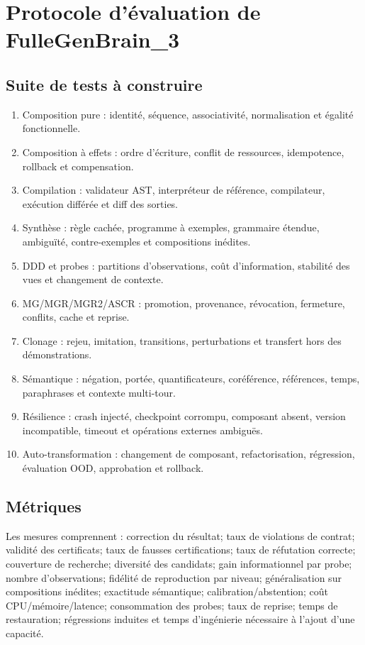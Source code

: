 \documentclass[11pt,a4paper]{article}
\begin{document}
\section{Protocole d'évaluation de FulleGenBrain\_3}
\subsection{Suite de tests à construire}
\begin{enumerate}
\item Composition pure : identité, séquence, associativité, normalisation et égalité fonctionnelle.
\item Composition à effets : ordre d'écriture, conflit de ressources, idempotence, rollback et compensation.
\item Compilation : validateur AST, interpréteur de référence, compilateur, exécution différée et diff des sorties.
\item Synthèse : règle cachée, programme à exemples, grammaire étendue, ambiguïté, contre-exemples et compositions inédites.
\item DDD et probes : partitions d'observations, coût d'information, stabilité des vues et changement de contexte.
\item MG/MGR/MGR2/ASCR : promotion, provenance, révocation, fermeture, conflits, cache et reprise.
\item Clonage : rejeu, imitation, transitions, perturbations et transfert hors des démonstrations.
\item Sémantique : négation, portée, quantificateurs, coréférence, références, temps, paraphrases et contexte multi-tour.
\item Résilience : crash injecté, checkpoint corrompu, composant absent, version incompatible, timeout et opérations externes ambiguës.
\item Auto-transformation : changement de composant, refactorisation, régression, évaluation OOD, approbation et rollback.
\end{enumerate}

\subsection{Métriques}
Les mesures comprennent : correction du résultat; taux de violations de contrat; validité des certificats; taux de fausses certifications; taux de réfutation correcte; couverture de recherche; diversité des candidats; gain informationnel par probe; nombre d'observations; fidélité de reproduction par niveau; généralisation sur compositions inédites; exactitude sémantique; calibration/abstention; coût CPU/mémoire/latence; consommation des probes; taux de reprise; temps de restauration; régressions induites et temps d'ingénierie nécessaire à l'ajout d'une capacité.
\end{document}
